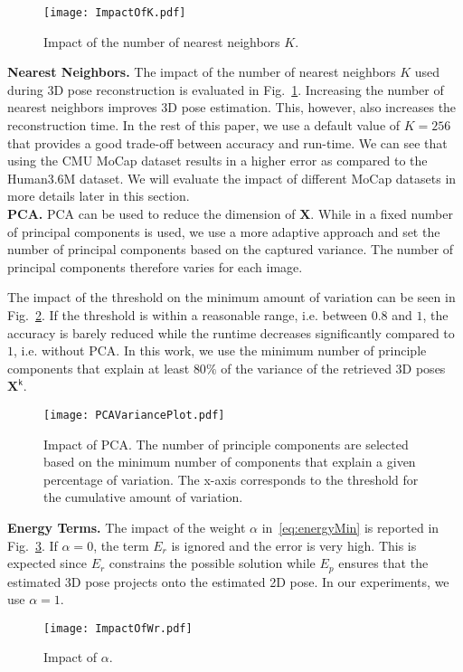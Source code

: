 \documentclass[10pt,journal,compsoc]{IEEEtran}
\makeatletter
\newcommand*{\ie}{i.e.\@\xspace}
\makeatother
\begin{document}
\begin{figure}[t]
\begin{center}
\texttt{[image: ImpactOfK.pdf]}
\end{center}
   \caption{Impact of the number of nearest neighbors $K$.}
\label{fig:ImpactOfK}
\end{figure}

\noindent\textbf{Nearest Neighbors.} The impact of the number of nearest neighbors $K$ used during
3D pose reconstruction is evaluated in Fig.~\ref{fig:ImpactOfK}. Increasing the number of nearest neighbors
improves 3D pose estimation. This, however, also increases the reconstruction time. In the rest of this paper, we use a default value of $K=256$ that provides a good trade-off between accuracy and run-time. We can see 
that using the CMU MoCap dataset results in a higher error as compared to the Human3.6M dataset. We will evaluate
the impact of different MoCap datasets in more details later in this section. \\

\noindent\textbf{PCA.} PCA can be used to reduce the dimension of $\mathbf{X}$. While
in \cite{Yasin_2016_CVPR} a fixed number of principal components is used, we use a more adaptive approach and set the number of principal components based on the captured variance. The number of principal components therefore varies for each image.   

The impact of the threshold on the minimum amount of variation can be seen in Fig.~\ref{fig:PCAVariancePlot}. If the threshold is within a reasonable range, \ie between $0.8$ and $1$, the accuracy is barely reduced while the runtime decreases significantly compared to $1$, \ie without PCA. In this work, we use the minimum number of principle components that explain at least $80\%$ of the variance of the retrieved 3D poses $\mathbf{X}^{\mathsf{k}}$.\\
\begin{figure}[t]
\begin{center}
\texttt{[image: PCAVariancePlot.pdf]}
\end{center}
   \caption{Impact of PCA. The number of principle components are selected based on the minimum number of components that explain a given percentage of variation. The x-axis corresponds to the threshold for the cumulative amount of variation.}
\label{fig:PCAVariancePlot}
\end{figure}

\noindent\textbf{Energy Terms.} The impact of the weight $\alpha$ in~\eqref{eq:energyMin} is reported
in Fig.~\ref{fig:ImpactOfAlpha}. If $\alpha=0$, the term $E_{r}$ is ignored and the error is very high. This is expected
since $E_{r}$ constrains the possible solution while $E_{p}$ ensures that the estimated 3D pose projects onto the estimated 2D pose.  
In our experiments, we use $\alpha=1$. \\
\begin{figure}[t]
\begin{center}
\texttt{[image: ImpactOfWr.pdf]}
\end{center}
   \caption{Impact of $\alpha$.}
\label{fig:ImpactOfAlpha}
\end{figure}
\end{document}
